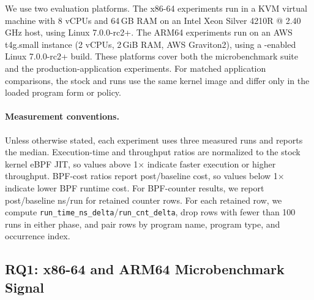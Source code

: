 We use two evaluation platforms.
The x86-64 experiments run in a KVM virtual machine with 8 vCPUs and 64\,GB RAM on an Intel Xeon Silver 4210R @ 2.40\,GHz host, using Linux 7.0.0-rc2+.
The ARM64 experiments run on an AWS t4g.small instance (2 vCPUs, 2\,GiB RAM, AWS Graviton2), using a \lang-enabled Linux 7.0.0-rc2+ build.
These platforms cover both the microbenchmark suite and the production-application experiments.
For matched application comparisons, the stock and \lang runs use the same kernel image and differ only in the loaded program form or \lang policy.

\paragraph{Measurement conventions.}
Unless otherwise stated, each experiment uses three measured runs and reports the median.
Execution-time and throughput ratios are normalized to the stock kernel eBPF JIT, so values above 1$\times$ indicate faster execution or higher throughput.
BPF-cost ratios report post/baseline cost, so values below 1$\times$ indicate lower BPF runtime cost.
For BPF-counter results, we report post/baseline ns/run for retained counter rows.
For each retained row, we compute \texttt{run\_time\_ns\_delta}/\texttt{run\_cnt\_delta}, drop rows with fewer than 100 runs in either phase, and pair rows by program name, program type, and occurrence index.

\subsection{RQ1: x86-64 and ARM64 Microbenchmark Signal}
\label{subsec:micro_benchmark}

